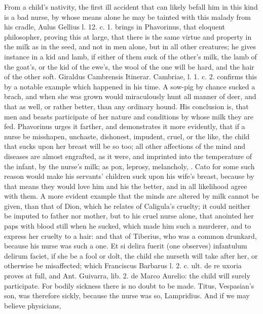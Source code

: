 {{From a child's nativity, the first ill accident that can likely befall
him in this kind is a bad nurse, by whose means alone he may be tainted
with this malady from his cradle, Aulus Gellius l. 12. c. 1.
brings in Phavorinus, that eloquent philosopher, proving this at large,
 that there is the same virtue and property in the milk as in the
seed, and not in men alone, but in all other creatures; he gives
instance in a kid and lamb, if either of them suck of the other's milk,
the lamb of the goat's, or the kid of the ewe's, the wool of the one
will be hard, and the hair of the other soft. Giraldus Cambrensis
Itinerar. Cambriae, l. 1. c. 2. confirms this by a notable example
which happened in his time. A sow-pig by chance sucked a brach, and
when she was grown would miraculously hunt all manner of deer,
and that as well, or rather better, than any ordinary hound. His
conclusion is, that men and beasts participate of her nature and
conditions by whose milk they are fed. Phavorinus urges it farther, and
demonstrates it more evidently, that if a nurse be misshapen,
unchaste, dishonest, impudent, cruel, or the like, the child that
sucks upon her breast will be so too; all other affections of the mind
and diseases are almost engrafted, as it were, and imprinted into the
temperature of the infant, by the nurse's milk; as pox, leprosy,
melancholy, \etc{}. Cato for some such reason would make his servants'
children suck upon his wife's breast, because by that means they would
love him and his the better, and in all likelihood agree with them. A
more evident example that the minds are altered by milk cannot be
given, than that of Dion, which he relates of Caligula's cruelty;
it could neither be imputed to father nor mother, but to his cruel
nurse alone, that anointed her paps with blood still when he sucked,
which made him such a murderer, and to express her cruelty to a hair:
and that of Tiberius, who was a common drunkard, because his nurse was
such a one. Et si delira fuerit (one observes) infantulum delirum
faciet, if she be a fool or dolt, the child she nurseth will take after
her, or otherwise be misaffected; which Franciscus Barbarus l. 2. c.
ult. de re uxoria proves at full, and Ant. Guivarra, lib. 2. de Marco
Aurelio: the child will surely participate. For bodily sickness there
is no doubt to be made. Titus, Vespasian's son, was therefore sickly,
because the nurse was so, Lampridius. And if we may believe physicians,
}}
